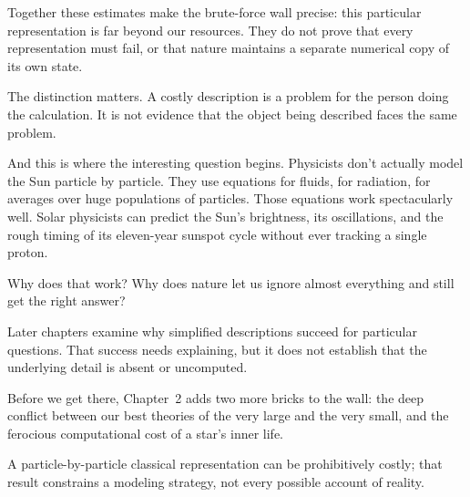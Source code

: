 Together these estimates make the brute-force wall precise: this particular representation is far beyond our resources. They do not prove that every representation must fail, or that nature maintains a separate numerical copy of its own state.

The distinction matters. A costly description is a problem for the person doing the calculation. It is not evidence that the object being described faces the same problem.

And this is where the interesting question begins. Physicists don't actually model the Sun particle by particle. They use equations for fluids, for radiation, for averages over huge populations of particles. Those equations work spectacularly well. Solar physicists can predict the Sun's brightness, its oscillations, and the rough timing of its eleven-year sunspot cycle without ever tracking a single proton.

Why does that work? Why does nature let us ignore almost everything and still get the right answer?

Later chapters examine why simplified descriptions succeed for particular questions. That success needs explaining, but it does not establish that the underlying detail is absent or uncomputed.

Before we get there, Chapter~2 adds two more bricks to the wall: the deep conflict between our best theories of the very large and the very small, and the ferocious computational cost of a star's inner life.

\begin{keytakeawaybox}
A particle-by-particle classical representation can be prohibitively costly; that result constrains a modeling strategy, not every possible account of reality.
\end{keytakeawaybox}
